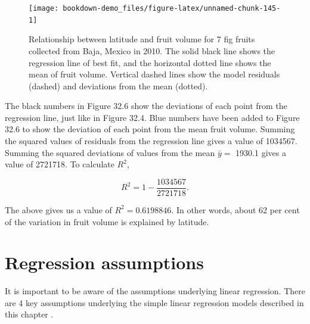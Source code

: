 \documentclass[
  openany]{krantz}
\begin{document}
\begin{figure}
\texttt{[image: bookdown-demo\_files/figure-latex/unnamed-chunk-145-1]} \caption{Relationship between latitude and fruit volume for 7 fig fruits collected from Baja, Mexico in 2010. The solid black line shows the regression line of best fit, and the horizontal dotted line shows the mean of fruit volume. Vertical dashed lines show the model residuals (dashed) and deviations from the mean (dotted).}\label{fig:unnamed-chunk-145}
\end{figure}

The black numbers in Figure 32.6 show the deviations of each point from the regression line, just like in Figure 32.4.
Blue numbers have been added to Figure 32.6 to show the deviation of each point from the mean fruit volume.
Summing the squared values of residuals from the regression line gives a value of 1034567.
Summing the squared deviations of values from the mean \(\bar{y} =\) 1930.1 gives a value of 2721718.
To calculate \(R^{2}\),

\[R^{2} = 1 - \frac{1034567}{2721718}.\]

The above gives us a value of \(R^{2} = 0.6198846\).
In other words, about 62 per cent of the variation in fruit volume is explained by latitude.

\hypertarget{regression-assumptions}{%
\section{Regression assumptions}\label{regression-assumptions}}

It is important to be aware of the assumptions underlying linear regression.
There are 4 key assumptions underlying the simple linear regression models described in this chapter \citep{Sokal1995}.
\end{document}

